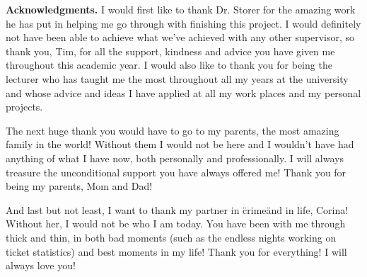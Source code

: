 \documentclass{mpaper}
\begin{document}
\vskip8pt \noindent
{\bf Acknowledgments.}
I would first like to thank Dr. Storer for the amazing work he has put in helping me go through with finishing 
this project. I would definitely not have been able to achieve what we've achieved with any other supervisor, so 
thank you, Tim, for all the support, kindness and advice you have given me throughout this academic year. I would 
also like to thank you for being the lecturer who has taught me the most throughout all my years at the university
and whose advice and ideas I have applied at all my work places and my personal projects.

The next huge thank you would have to go to my parents, the most amazing family in the world! Without them I would 
not be here and I wouldn't have had anything of what I have now, both personally and professionally. 
I will always treasure the unconditional support you have always offered me! Thank you for being my parents, Mom and Dad!

And last but not least, I want to thank my partner in \"crime\" and in life, Corina! Without her, I would not be who I 
am today. You have been with me through thick and thin, in both bad moments (such as the endless nights working 
on ticket statistics) and best moments in my life! Thank you for everything! I will always love you!



\end{document}
